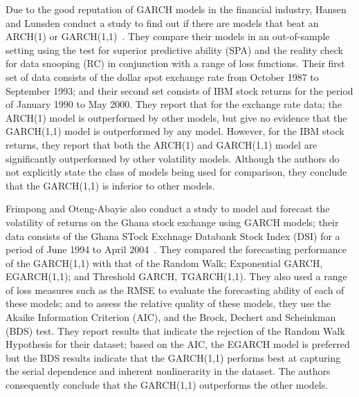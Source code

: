 \documentclass[13pt]{report}
\begin{document}
Due to the good reputation of GARCH models in the financial industry, Hansen and Lunsden conduct a study to find out if there are models that beat an ARCH(1) or GARCH(1,1)~\cite{modelhansen2005forecast}. They compare their models in an out-of-sample setting using the test for superior predictive ability (SPA) and the reality check for data snooping (RC) in conjunction with a range of loss functions. Their first set of data consists of the dollar spot exchange rate from October 1987  to September 1993; and their second set consists of IBM stock returns for the period of January 1990 to May 2000. They report that for the exchange rate data; the ARCH(1) model is outperformed by other models, but give no evidence that the  GARCH(1,1) model is outperformed by any model. However, for the IBM stock returns, they report that both the ARCH(1) and GARCH(1,1) model are significantly outperformed by other volatility models. Although the authors do not explicitly state the class of models being used for comparison, they conclude that the GARCH(1,1) is inferior to other models.

Frimpong and Oteng-Abayie also conduct a study to model and forecast the volatility of returns on the Ghana stock exchange using GARCH models; their data consists of the Ghana STock Exchnage Databank Stock Index (DSI) for a period of June 1994 to April 2004~\cite{frimpong2006modelling}. They compared the forecasting performance of the  GARCH(1,1) with that of the Random Walk; Exponential GARCH, EGARCH(1,1); and Threshold GARCH, TGARCH(1,1). They also used a range of loss measures such as the RMSE to evaluate the forecasting ability of each of these models; and to assess the relative quality of these models, they use the Akaike Information Criterion (AIC), and the Brock, Dechert and Scheinkman (BDS) test. They report results that indicate the rejection of the Random Walk Hypothesis for their dataset; based on the AIC,  the EGARCH model is preferred but the BDS results indicate that the GARCH(1,1) performs best at capturing the serial dependence and inherent nonlinerarity in the dataset. The authors consequently conclude that the GARCH(1,1) outperforms the other models.
\end{document}
